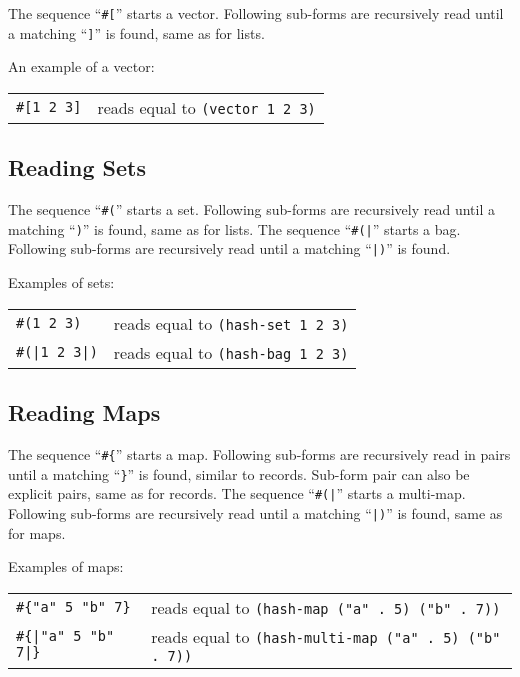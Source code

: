 The sequence ``\lstinline!#[!'' starts a vector. Following sub-forms are recursively read until a matching ``\lstinline!]!'' is found, same as for lists.

\example An example of a vector:

\begin{tabular}{ l l }
  \lstinline!#[1 2 3]! & reads equal to \lstinline!(vector 1 2 3)! \\
\end{tabular}





\subsection{Reading Sets}
\label{subsec:aml-base-lang-reader-sets}

The sequence ``\lstinline!#(!'' starts a set. Following sub-forms are recursively read until a matching ``\lstinline!)!'' is found, same as for lists. The sequence ``\lstinline!#(|!'' starts a bag. Following sub-forms are recursively read until a matching ``\lstinline!|)!'' is found.

\example Examples of sets:

\begin{tabular}{ l l }
  \lstinline!#(1 2 3)! & reads equal to \lstinline!(hash-set 1 2 3)! \\
  \lstinline!#(|1 2 3|)! & reads equal to \lstinline!(hash-bag 1 2 3)! \\
\end{tabular}





\subsection{Reading Maps}
\label{subsec:aml-base-lang-reader-maps}

The sequence ``\lstinline!#{!'' starts a map. Following sub-forms are recursively read in pairs until a matching ``\lstinline!}!'' is found, similar to records. Sub-form pair can also be explicit pairs, same as for records. The sequence ``\lstinline!#(|!'' starts a multi-map. Following sub-forms are recursively read until a matching ``\lstinline!|)!'' is found, same as for maps.

\example Examples of maps:

\begin{tabular}{ l l }
  \lstinline!#{"a" 5 "b" 7}! & reads equal to \lstinline!(hash-map ("a" . 5) ("b" . 7))! \\
  \lstinline!#{|"a" 5 "b" 7|}! & reads equal to \lstinline!(hash-multi-map ("a" . 5) ("b" . 7))! \\
\end{tabular}





